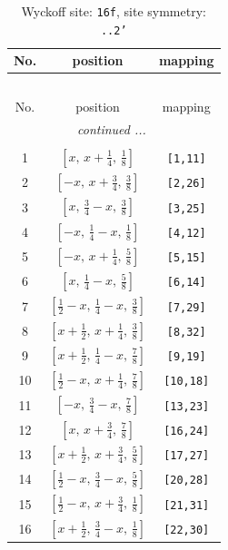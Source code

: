 \documentclass[fleqn,8pt]{jsarticle}
\begin{document}
\renewcommand{\arraystretch}{1.2}
\begin{longtable}{ccc}
\caption{Wyckoff site: {\tt 16f}, site symmetry: {\tt ..2'}}
 \\
 \hline \hline
No. & position & mapping \\ \hline \endfirsthead

\multicolumn{2}{l}{\tablename\ \thetable{}} \\
 \hline \hline
No. & position & mapping \\ \hline \endhead

 \hline \hline
\multicolumn{2}{r}{\footnotesize\it continued ...} \\ \endfoot

 \hline \hline
\multicolumn{2}{r}{} \\ \endlastfoot

1 & $\left[ x,\, x + \frac{1}{4},\, \frac{1}{8} \right]$ & {\tt [1,11]} \\ \hline
2 & $\left[ - x,\, x + \frac{3}{4},\, \frac{3}{8} \right]$ & {\tt [2,26]} \\ \hline
3 & $\left[ x,\, \frac{3}{4} - x,\, \frac{3}{8} \right]$ & {\tt [3,25]} \\ \hline
4 & $\left[ - x,\, \frac{1}{4} - x,\, \frac{1}{8} \right]$ & {\tt [4,12]} \\ \hline
5 & $\left[ - x,\, x + \frac{1}{4},\, \frac{5}{8} \right]$ & {\tt [5,15]} \\ \hline
6 & $\left[ x,\, \frac{1}{4} - x,\, \frac{5}{8} \right]$ & {\tt [6,14]} \\ \hline
7 & $\left[ \frac{1}{2} - x,\, \frac{1}{4} - x,\, \frac{3}{8} \right]$ & {\tt [7,29]} \\ \hline
8 & $\left[ x + \frac{1}{2},\, x + \frac{1}{4},\, \frac{3}{8} \right]$ & {\tt [8,32]} \\ \hline
9 & $\left[ x + \frac{1}{2},\, \frac{1}{4} - x,\, \frac{7}{8} \right]$ & {\tt [9,19]} \\ \hline
10 & $\left[ \frac{1}{2} - x,\, x + \frac{1}{4},\, \frac{7}{8} \right]$ & {\tt [10,18]} \\ \hline
11 & $\left[ - x,\, \frac{3}{4} - x,\, \frac{7}{8} \right]$ & {\tt [13,23]} \\ \hline
12 & $\left[ x,\, x + \frac{3}{4},\, \frac{7}{8} \right]$ & {\tt [16,24]} \\ \hline
13 & $\left[ x + \frac{1}{2},\, x + \frac{3}{4},\, \frac{5}{8} \right]$ & {\tt [17,27]} \\ \hline
14 & $\left[ \frac{1}{2} - x,\, \frac{3}{4} - x,\, \frac{5}{8} \right]$ & {\tt [20,28]} \\ \hline
15 & $\left[ \frac{1}{2} - x,\, x + \frac{3}{4},\, \frac{1}{8} \right]$ & {\tt [21,31]} \\ \hline
16 & $\left[ x + \frac{1}{2},\, \frac{3}{4} - x,\, \frac{1}{8} \right]$ & {\tt [22,30]} \\
\end{longtable}
\end{document}
